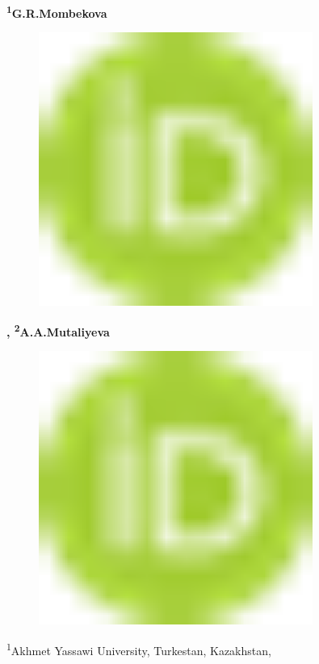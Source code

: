 {\bfseries \textsuperscript{1}G.R.Mombekova}
\begin{figure}[H]
	\centering
	\includegraphics[width=0.8\textwidth]{media/ekon2/image1}
	\caption*{}
\end{figure}
{\bfseries ,
\textsuperscript{2}A.A.Mutaliyeva}
\begin{figure}[H]
	\centering
	\includegraphics[width=0.8\textwidth]{media/ekon2/image1}
	\caption*{}
\end{figure}


\textsuperscript{1}Akhmet Yassawi University, Turkestan, Kazakhstan,

